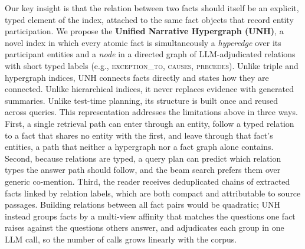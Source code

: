 \documentclass[runningheads]{llncs}
\newcommand{\sys}{UNH}
\newcommand{\sysfull}{Unified Narrative Hypergraph} %
\newcommand{\rel}[1]{\textsc{#1}}
\begin{document}
Our key insight is that the relation between two facts should itself be an explicit, typed element of the index, attached to the same fact objects that record entity participation. We propose the \textbf{\sysfull{} (\sys{})}, a novel index in which every atomic fact is simultaneously a \emph{hyperedge} over its participant entities and a \emph{node} in a directed graph of LLM-adjudicated relations with short typed labels (e.g., \rel{exception\_to}, \rel{causes}, \rel{precedes}). Unlike triple and hypergraph indices, \sys{} connects facts directly and states how they are connected. Unlike hierarchical indices, it never replaces evidence with generated summaries. Unlike test-time planning, its structure is built once and reused across queries. This representation addresses the limitations above in three ways. First, a single retrieval path can enter through an entity, follow a typed relation to a fact that shares no entity with the first, and leave through that fact's entities, a path that neither a hypergraph nor a fact graph alone contains. Second, because relations are typed, a query plan can predict which relation types the answer path should follow, and the beam search prefers them over generic co-mention. Third, the reader receives deduplicated chains of extracted facts linked by relation labels, which are both compact and attributable to source passages. Building relations between all fact pairs would be quadratic; \sys{} instead groups facts by a multi-view affinity that matches the questions one fact raises against the questions others answer, and adjudicates each group in one LLM call, so the number of calls grows linearly with the corpus.
\end{document}
